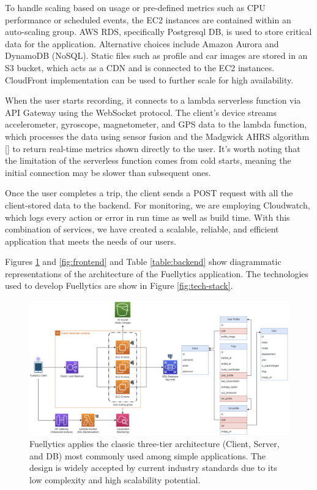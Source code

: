 \documentclass[11pt, oneside]{article}
\newcounter{refno}
\newcommand{\reflabel}[1]{\refstepcounter{refno}\label{#1}[\arabic{refno}]}  %
\begin{document}
To handle scaling based on usage or pre-defined metrics such as CPU performance or scheduled events, the EC2 instances are contained within an auto-scaling group. AWS RDS, specifically Postgresql DB, is used to store critical data for the application. Alternative choices include Amazon Aurora and DynamoDB (NoSQL). Static files such as profile and car images are stored in an S3 bucket, which acts as a CDN and is connected to the EC2 instances. CloudFront implementation can be used to further scale for high availability.

When the user starts recording, it connects to a lambda serverless function via API Gateway using the WebSocket protocol. The client's device streams accelerometer, gyroscope, magnetometer, and GPS data to the lambda function, which processes the data using sensor fusion and the Madgwick AHRS algorithm \reflabel{madgwick} to return real-time metrics shown directly to the user. It's worth noting that the limitation of the serverless function comes from cold starts, meaning the initial connection may be slower than subsequent ones.

Once the user completes a trip, the client sends a POST request with all the client-stored data to the backend. For monitoring, we are employing Cloudwatch, which logs every action or error in run time as well as build time. With this combination of services, we have created a scalable, reliable, and efficient application that meets the needs of our users.

Figures \ref{fig:architecture} and \ref{fig:frontend} and Table \ref{table:backend} show diagrammatic representations of the architecture of the Fuellytics application.  The technologies used to develop Fuellytics are show in Figure \ref{fig:tech-stack}.

\begin{figure}[!htb]
\centerline{\includegraphics[width=19cm]{img/architecture/architecture-aws.png}}
\caption{\label{fig:architecture}Fuellytics applies the classic three-tier architecture (Client, Server, and DB) most commonly used among simple applications. The design is widely accepted by current industry standards due to its low complexity and high scalability potential.}
\end{figure}
\end{document}
